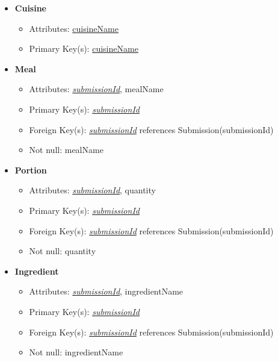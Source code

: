 \begin{itemize}
        \item \textbf{Cuisine}
        \begin{itemize}
            \item Attributes: \underline{cuisineName}
            \item Primary Key(s): \underline{cuisineName}        
        \end{itemize}

        \item \textbf{Meal}
        \begin{itemize}
            \item Attributes: \underline{\textit{submissionId}}, mealName
            \item Primary Key(s): \underline{\textit{submissionId}}
            \item Foreign Key(s): \underline{\textit{submissionId}} references Submission(submissionId)
            \item Not null: mealName
        \end{itemize}

        \item \textbf{Portion}
        \begin{itemize}
            \item Attributes: \underline{\textit{submissionId}}, quantity
            \item Primary Key(s): \underline{\textit{submissionId}}
            \item Foreign Key(s): \underline{\textit{submissionId}} references Submission(submissionId)
            \item Not null: quantity
        \end{itemize}

        \newpage
        \item \textbf{Ingredient}
        \begin{itemize}
            \item Attributes: \underline{\textit{submissionId}}, ingredientName
            \item Primary Key(s): \underline{\textit{submissionId}}
            \item Foreign Key(s): \underline{\textit{submissionId}} references Submission(submissionId)
            \item Not null: ingredientName
        \end{itemize}


\end{itemize}
